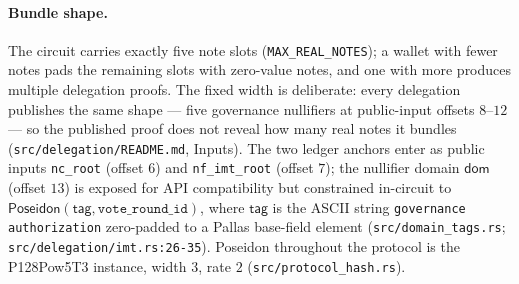 \documentclass[11pt,a4paper]{article}
\theoremstyle{definition}
\begin{document}
\paragraph{Bundle shape.} The circuit carries exactly five note slots
(\texttt{MAX\_\allowbreak REAL\_\allowbreak NOTES}); a wallet with fewer notes
pads the remaining slots with zero-value notes, and one with more produces
multiple delegation proofs. The fixed width is deliberate: every delegation
publishes the same shape --- five governance nullifiers at public-input
offsets $8$--$12$ --- so the published proof does not reveal how many real
notes it bundles (\texttt{src/delegation/README.md}, Inputs). The two ledger
anchors enter as public inputs \texttt{nc\_root} (offset $6$) and
\texttt{nf\_imt\_root} (offset $7$); the nullifier domain $\mathsf{dom}$
(offset $13$) is exposed for API compatibility but constrained in-circuit to
$\mathsf{Poseidon}(\mathsf{tag}, \texttt{vote\_round\_id})$, where
$\mathsf{tag}$ is the ASCII string \texttt{governance authorization}
zero-padded to a Pallas base-field element
(\texttt{src/domain\_tags.rs}; \texttt{src/delegation/imt.rs:26-35}).
Poseidon throughout the protocol is the P128Pow5T3 instance, width $3$,
rate $2$ (\texttt{src/protocol\_hash.rs}).
\end{document}
